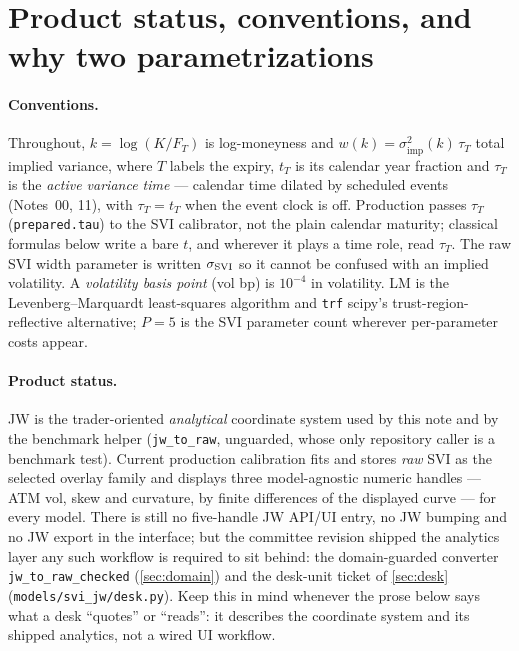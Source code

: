 \documentclass[11pt]{article}
\begin{document}
\newpage
\tableofcontents
\newpage

\section{Product status, conventions, and why two parametrizations}
\label{sec:why}

\paragraph{Conventions.} Throughout, $k=\log(K/F_T)$ is log-moneyness and
$w(k)=\sigma_{\mathrm{imp}}^2(k)\,\tau_T$ total implied variance, where $T$
labels the expiry, $t_T$ is its calendar year fraction and $\tau_T$ is the
\emph{active variance time} --- calendar time dilated by scheduled events
(Notes~00, 11), with $\tau_T=t_T$ when the event clock is off. Production
passes $\tau_T$ (\texttt{prepared.tau}) to the SVI calibrator, not the plain
calendar maturity; classical formulas below write a bare $t$, and wherever it
plays a time role, read $\tau_T$. The raw SVI width parameter is written
$\sigma_{\mathrm{SVI}}$ so it cannot be confused with an implied volatility. A
\emph{volatility basis point} (vol bp) is $10^{-4}$ in volatility. LM is the
Levenberg--Marquardt least-squares algorithm and \texttt{trf} scipy's
trust-region-reflective alternative; $P=5$ is the SVI parameter count wherever
per-parameter costs appear.

\paragraph{Product status.} JW is the trader-oriented \emph{analytical}
coordinate system used by this note and by the benchmark helper
(\texttt{jw\_to\_raw}, unguarded, whose only repository caller is a benchmark
test). Current production calibration fits and stores \emph{raw} SVI as the
selected overlay family and displays three model-agnostic numeric handles ---
ATM vol, skew and curvature, by finite differences of the displayed curve ---
for every model. There is still no five-handle JW API/UI entry, no JW bumping
and no JW export in the interface; but the committee revision shipped the
analytics layer any such workflow is required to sit behind: the
domain-guarded converter \texttt{jw\_to\_raw\_checked}
(\cref{sec:domain}) and the desk-unit ticket of \cref{sec:desk}
(\texttt{models/svi\_jw/desk.py}). Keep this in mind whenever the prose below
says what a desk ``quotes'' or ``reads'': it describes the coordinate system
and its shipped analytics, not a wired UI workflow.
\end{document}
